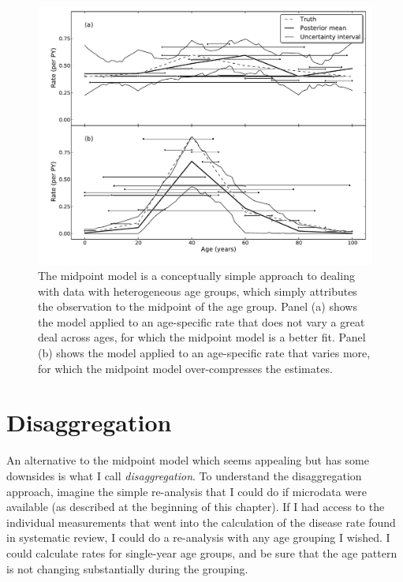 \begin{figure}[h]
\begin{center}
\includegraphics[width=\textwidth]{age_group_midpoint.pdf}
\caption{The midpoint model is a conceptually simple approach to
  dealing with data with heterogeneous age groups, which simply
  attributes the observation to the midpoint of the age group.  Panel
  (a) shows the model applied to an age-specific rate that does not
  vary a great deal across ages, for which the midpoint model is a
  better fit.  Panel (b) shows the model applied to an age-specific rate
  that varies more, for which the midpoint model over-compresses the
  estimates.}
\label{midpoint}
\end{center}
\end{figure}


\section{Disaggregation}
An alternative to the midpoint model which seems appealing but has
some downsides is what I call \emph{disaggregation}.  To understand
the disaggregation approach, imagine the simple re-analysis that I
could do if microdata were available (as described at the beginning of
this chapter).  If I had access to the individual measurements that
went into the calculation of the disease rate found in systematic
review, I could do a re-analysis with any age grouping I wished. I
could calculate rates for single-year age groups, and be sure that the
age pattern is not changing substantially during the grouping.

